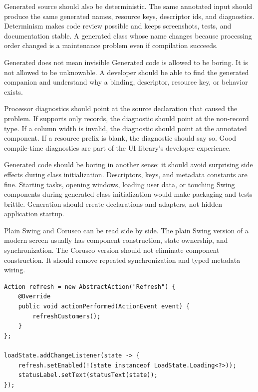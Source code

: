 Generated source should also be deterministic. The same annotated input should produce the same generated names, resource keys, descriptor ids, and diagnostics. Determinism makes code review possible and keeps screenshots, tests, and documentation stable. A generated class whose name changes because processing order changed is a maintenance problem even if compilation succeeds.

\begin{principlebox}{Generated does not mean invisible}
Generated code is allowed to be boring. It is not allowed to be unknowable. A developer should be able to find the generated companion and understand why a binding, descriptor, resource key, or behavior exists.
\end{principlebox}

Processor diagnostics should point at the source declaration that caused the problem. If  supports only records, the diagnostic should point at the non-record type. If a column width is invalid, the diagnostic should point at the annotated component. If a resource prefix is blank, the diagnostic should say so. Good compile-time diagnostics are part of the UI library's developer experience.

Generated code should be boring in another sense: it should avoid surprising side effects during class initialization. Descriptors, keys, and metadata constants are fine. Starting tasks, opening windows, loading user data, or touching Swing components during generated class initialization would make packaging and tests brittle. Generation should create declarations and adapters, not hidden application startup.

Plain Swing and Corusco can be read side by side. The plain Swing version of a modern screen usually has component construction, state ownership, and synchronization. The Corusco version should not eliminate component construction. It should remove repeated synchronization and typed metadata wiring.

\begin{lstlisting}[caption={Plain Swing command state.}]
Action refresh = new AbstractAction("Refresh") {
    @Override
    public void actionPerformed(ActionEvent event) {
        refreshCustomers();
    }
};

loadState.addChangeListener(state -> {
    refresh.setEnabled(!(state instanceof LoadState.Loading<?>));
    statusLabel.setText(statusText(state));
});
\end{lstlisting}

